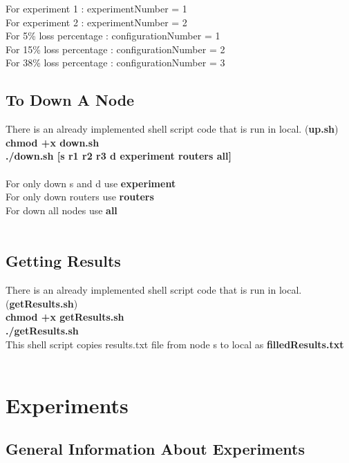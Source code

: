 \documentclass[conference]{IEEEtran}
\begin{document}
For experiment 1 : experimentNumber = 1 \\
For experiment 2 : experimentNumber = 2 \\

For 5\% loss percentage : configurationNumber = 1 \\
For 15\% loss percentage : configurationNumber = 2 \\
For 38\% loss percentage : configurationNumber = 3 \\

\subsection{To Down A Node}

There is an already implemented shell script code that is run in local. (\textbf{up.sh}) \\
\textbf{chmod +x down.sh} \\
\textbf{./down.sh [s \textbar r1 \textbar r2 \textbar r3 \textbar d \textbar experiment \textbar routers \textbar all]} \\ \\
For only down s and d use \textbf{experiment} \\
For only down routers use \textbf{routers} \\
For down all nodes use \textbf{all} \\ \\

\subsection{Getting Results}

There is an already implemented shell script code that is run in local. (\textbf{getResults.sh}) \\
\textbf{chmod +x getResults.sh} \\
\textbf{./getResults.sh} \\

This shell script copies results.txt file from node s to local as \textbf{filledResults.txt} \\ \\ 

\section{Experiments}

\subsection{General Information About Experiments}
\end{document}
